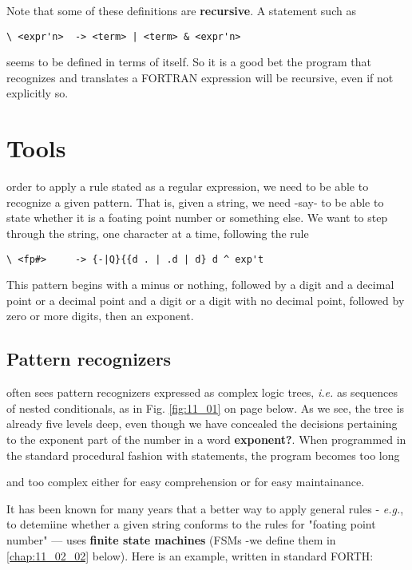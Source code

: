Note that some of these definitions are \textbf{recursive}. A statement such as

\begin{verbatim}
\ <expr'n>  -> <term> | <term> & <expr'n>
\end{verbatim}

seems to be defined in terms of itself. So it is a good bet the program that recognizes and translates a FORTRAN expression will be recursive, even if not explicitly so.

\section{Tools}
 order to apply a rule stated as a regular expression, we need to be able to recognize a given pattern. That is, given a string, we need -say- to be able to state whether it is a foating point number or something else. We want to step through the string, one character at a time, following the rule

\begin{verbatim}
\ <fp#>     -> {-|Q}{{d . | .d | d} d ^ exp't
\end{verbatim}

This pattern begins with a minus or nothing, followed by a digit and a decimal point or a decimal point and a digit or a digit with no decimal point, followed by zero or more digits, then an exponent.

\subsection{Pattern recognizers}
 often sees pattern recognizers expressed as complex logic trees, \textit{i.e.} as sequences of nested conditionals, as in Fig. \ref{fig:11_01} on page \pageref{fig:11_01} below. As we see, the tree is already five levels deep, even though we have concealed the decisions pertaining to the exponent part of the number in a word \textbf{exponent?}. When programmed in the standard procedural fashion with  statements, the program becomes too long



and too complex either for easy comprehension or for easy maintainance.

It has been known for many years that a better way to apply general rules - \textit{e.g.}, to detemiine whether a given string conforms to the rules for "foating point number" --- uses \textbf{finite state machines} (FSMs -we define them in \ref{chap:11_02_02} below). Here is an example, written in standard FORTH:

